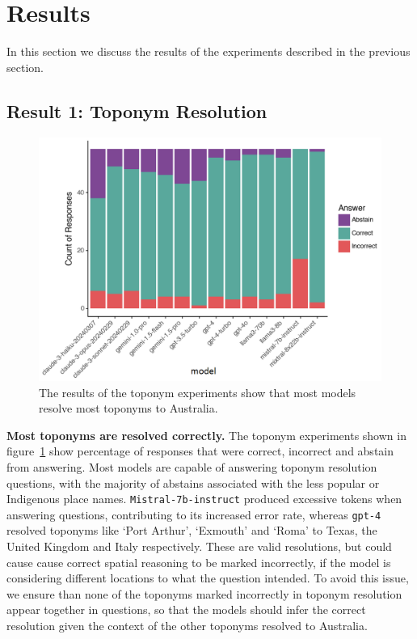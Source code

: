 

\section{Results}
\label{section:results}

In this section we discuss the results of the experiments described in the previous section.

\subsection{Result 1: Toponym Resolution}

\begin{figure}
    \centering
    \includegraphics[width=\columnwidth]{figures/toponym_bar_country}
    \caption{The results of the toponym experiments show that most models resolve most toponyms to Australia. }
    \label{fig:toponym}
\end{figure}

\textbf{Most toponyms are resolved correctly.}
The toponym experiments shown in figure~\ref{fig:toponym} show percentage of responses that were correct, incorrect and abstain from answering. 
Most models are capable of answering toponym resolution questions, with the majority of abstains associated with the less popular or Indigenous place names. 
\texttt{Mistral-7b-instruct} produced excessive tokens when answering questions, contributing to its increased error rate, whereas \texttt{gpt-4} resolved toponyms like `Port Arthur', `Exmouth' and `Roma' to Texas, the United Kingdom and Italy respectively.
These are valid resolutions, but could cause cause correct spatial reasoning to be marked incorrectly, if the model is considering different locations to what the question intended.
To avoid this issue, we ensure than none of the toponyms marked incorrectly in toponym resolution appear together in questions, so that the models should infer the correct resolution given the context of the other toponyms resolved to Australia.




